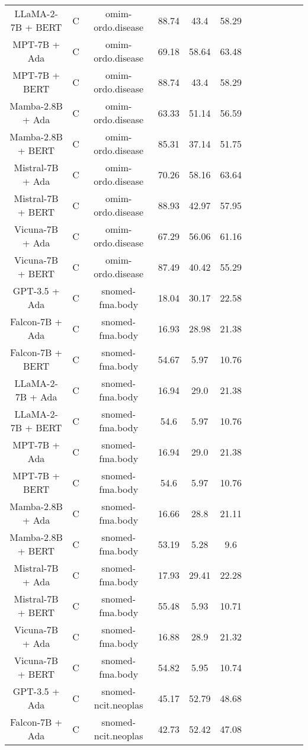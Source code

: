 \begin{table}
\begin{tabular}{|c|c|c|c|c|c|c|c|c|c|c|c|}
	LLaMA-2-7B + BERT  & C & omim-ordo.disease  &  88.74 &  43.4 & 58.29  \\
	MPT-7B + Ada  & C & omim-ordo.disease  &  69.18 &  58.64 & 63.48  \\
	MPT-7B + BERT  & C & omim-ordo.disease  &  88.74 &  43.4 & 58.29  \\
	Mamba-2.8B + Ada  & C & omim-ordo.disease  &  63.33 &  51.14 & 56.59  \\
	Mamba-2.8B + BERT  & C & omim-ordo.disease  &  85.31 &  37.14 & 51.75  \\
	Mistral-7B + Ada  & C & omim-ordo.disease  &  70.26 &  58.16 & 63.64  \\
	Mistral-7B + BERT  & C & omim-ordo.disease  &  88.93 &  42.97 & 57.95  \\
	Vicuna-7B + Ada  & C & omim-ordo.disease  &  67.29 &  56.06 & 61.16  \\
	Vicuna-7B + BERT  & C & omim-ordo.disease  &  87.49 &  40.42 & 55.29  \\
	\hline
	GPT-3.5 + Ada  & C & snomed-fma.body  &  18.04 &  30.17 & 22.58  \\
	Falcon-7B + Ada  & C & snomed-fma.body  &  16.93 &  28.98 & 21.38  \\
	Falcon-7B + BERT  & C & snomed-fma.body  &  54.67 &  5.97 & 10.76  \\
	LLaMA-2-7B + Ada  & C & snomed-fma.body  &  16.94 &  29.0 & 21.38  \\
	LLaMA-2-7B + BERT  & C & snomed-fma.body  &  54.6 &  5.97 & 10.76  \\
	MPT-7B + Ada  & C & snomed-fma.body  &  16.94 &  29.0 & 21.38  \\
	MPT-7B + BERT  & C & snomed-fma.body  &  54.6 &  5.97 & 10.76  \\
	Mamba-2.8B + Ada  & C & snomed-fma.body  &  16.66 &  28.8 & 21.11  \\
	Mamba-2.8B + BERT  & C & snomed-fma.body  &  53.19 &  5.28 & 9.6  \\
	Mistral-7B + Ada  & C & snomed-fma.body  &  17.93 &  29.41 & 22.28  \\
	Mistral-7B + BERT  & C & snomed-fma.body  &  55.48 &  5.93 & 10.71  \\
	Vicuna-7B + Ada  & C & snomed-fma.body  &  16.88 &  28.9 & 21.32  \\
	Vicuna-7B + BERT  & C & snomed-fma.body  &  54.82 &  5.95 & 10.74  \\
	\hline
	GPT-3.5 + Ada  & C & snomed-ncit.neoplas  &  45.17 &  52.79 & 48.68  \\
	Falcon-7B + Ada  & C & snomed-ncit.neoplas  &  42.73 &  52.42 & 47.08  \\

\end{tabular}
\end{table}
